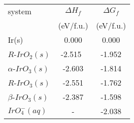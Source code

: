 \begin{tabular}{lcc}
\toprule
                system & $\Delta H_{f}$ & $\Delta G_{f}$ \\
                       &      (eV/f.u.) &      (eV/f.u.) \\
\midrule
                 Ir(s) &          0.000 &          0.000 \\
      $R$-$IrO_{2}(s)$ &         -2.515~\cite{Barin1995} &         -1.952 \\
 $\alpha$-$IrO_{3}(s)$ &         -2.603 &         -1.814 \\
      $R$-$IrO_{3}(s)$ &         -2.551 &         -1.762 \\
  $\beta$-$IrO_{3}(s)$ &         -2.387 &         -1.598 \\
     $IrO_{4}^{-}(aq)$ &              - &         -2.038 \\
\bottomrule
\end{tabular}

